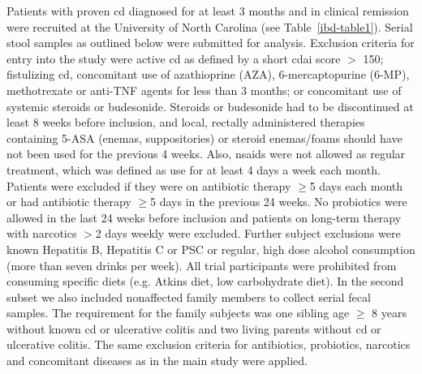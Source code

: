 Patients with proven \gls{cd} diagnosed for at least 3 months and in clinical remission were recruited at the University of North Carolina (see Table~\ref{ibd-table1}). Serial stool samples as outlined below were submitted for analysis. Exclusion criteria for entry into the study were active \gls{cd} as defined by a short \gls{cdai} score $>$ 150; fistulizing \gls{cd}, concomitant use of azathioprine (AZA), 6-mercaptopurine (6-MP), methotrexate or anti-TNF agents for less than 3 months; or concomitant use of systemic steroids or budesonide. Steroids or budesonide had to be discontinued at least 8 weeks before inclusion, and local, rectally administered therapies containing 5-ASA (enemas, suppositories) or steroid enemas/foams should have not been used for the previous 4 weeks. Also, \glspl{nsaid} were not allowed as regular treatment, which was defined as use for at least 4 days a week each month. Patients were excluded if they were on antibiotic therapy $\geq$5 days each month or had antibiotic therapy $\geq$5 days in the previous 24 weeks. No probiotics were allowed in the last 24 weeks before inclusion and patients on long-term therapy with narcotics $>$2 days weekly were excluded.  Further subject exclusions were known Hepatitis B, Hepatitis C or PSC or regular, high dose alcohol consumption (more than seven drinks per week). All trial participants were prohibited from consuming specific diets (e.g. Atkins diet, low carbohydrate diet). In the second subset we also included nonaffected family members to collect serial fecal samples.  The requirement for the family subjects was one sibling age $\geq$ 8 years without known \gls{cd} or ulcerative colitis and two living parents without \gls{cd} or ulcerative colitis. The same exclusion criteria for antibiotics, probiotics, narcotics and concomitant diseases as in the main study were applied. 

